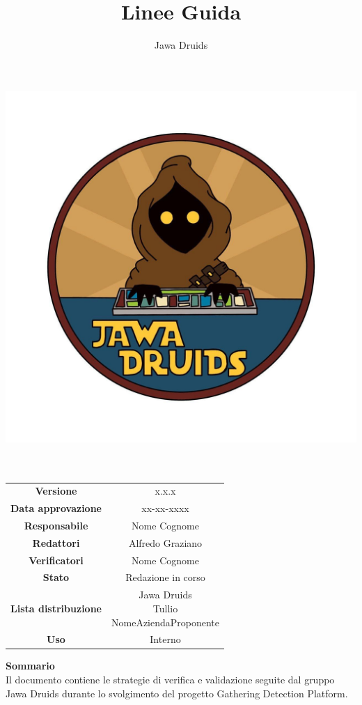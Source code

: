 \documentclass[a4paper,12pt]{report}
\begin{document}
	
	\makeatletter
	\begin{titlepage}
		\begin{center}
			\vspace*{-4,0cm}
			\author{Jawa Druids}
			\title{Linee Guida}
			\date{} %
			\includegraphics[width=0.7\linewidth]{../immagini/DRUIDSLOGO.jpg}\\[4ex]
			{\huge \bfseries  \@title }\\[2ex]
			{\LARGE  \@author}\\[50ex]
			\vspace*{-8,0cm}
			\begin{table}[H]
				\centering
				\begin{tabular}{c|c}
					\textbf{Versione} & x.x.x \\
					\textbf{Data approvazione} & xx-xx-xxxx\\
					\textbf{Responsabile} & Nome Cognome\\
					\textbf{Redattori} & Alfredo Graziano \\
					\textbf{Verificatori} & Nome Cognome \\
					\textbf{Stato} & Redazione in corso\\
					\textbf{Lista distribuzione} & \makecell{Jawa Druids \\ Tullio \\ NomeAziendaProponente}\\
					\textbf{Uso} & Interno
				\end{tabular}
			\end{table}
			\vspace{.8cm}
			\hfill \break
			\fontsize{17}{10}\textbf{Sommario}\\
			\vspace{.3cm}
				Il documento contiene le strategie di verifica e validazione seguite dal gruppo Jawa Druids durante lo svolgimento del progetto Gathering Detection Platform.
		\end{center}
	\end{titlepage}
	\makeatother
	
	
	\tableofcontents{}
	
	
	
\end{document}

